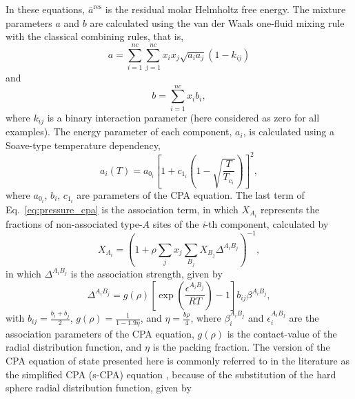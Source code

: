 \documentclass[preprint,12pt,3p]{elsarticle}
\begin{document}
In these equations, $\bar{a}^\text{res}$ is the residual molar Helmholtz free energy.
The mixture parameters $a$ and $b$ are calculated using the van der Waals one-fluid mixing rule with the classical combining rules, that is,
\begin{equation}
a = \sum_{i=1}^{nc} \sum_{j=1}^{nc} x_{i}x_{j}\sqrt{a_{i}a_{j}}(1-k_{ij})
\end{equation}
and
\begin{equation}
b = \sum_{i=1}^{nc}x_{i}b_{i},
\end{equation}
where $k_{ij}$ is a binary interaction parameter (here considered as zero for all examples).
The energy parameter of each component, $a_{i}$, is calculated using a Soave-type temperature dependency,
\begin{equation}
a_{i}(T) = a_{0_{i}}\left[1+c_{1_{i}}\left(1-\sqrt{\frac{T}{T_{c_{i}}}}\right)\right]^2,
\end{equation}
where $a_{0_{i}}$, $b_{i}$, $c_{1_{i}}$ are parameters of the CPA equation.
The last term of Eq.~\ref{eq:pressure_cpa} is the association term, in which $X_{A_{i}}$ represents the fractions of non-associated type-$A$ sites of the \textit{i}-th component, calculated by
\begin{equation} \label{eq:frac_nb}
X_{A_{i}} = \left(1+\rho \sum_{j}x_{j} \sum_{B_{j}} X_{B_{j}} \Delta^{A_{i}B_{j}}\right)^{-1},
\end{equation}
in which $\Delta^{A_{i}B_{j}}$ is the association strength, given by
\begin{equation} \label{eq:delta_cpa}
\Delta^{A_{i}B_{j}} = g(\rho)\left[\exp\left(\frac{\epsilon^{A_{i}B_{j}}}{RT}\right)-1\right]b_{ij}\beta^{A_{i}B_{j}},
\end{equation}
with $b_{ij} = \frac{b_{i}+b_{j}}{2}$, $g(\rho) = \frac{1}{1-1.9\eta}$, and $\eta = \frac{b\rho}{4}$,
where $\beta_{i}^{A_{i}B_{j}}$ and $\epsilon_{i}^{A_{i}B_{j}}$ are the association parameters of the CPA equation, $g(\rho)$ is the contact-value of the radial distribution function, and $\eta$ is the packing fraction.
The version of the CPA equation of state presented here is commonly referred to in the literature as the simplified CPA (s-CPA) equation \citep{kontogeorgis1999multicomponent}, because of the substitution of the hard sphere radial distribution function, given by
\end{document}

